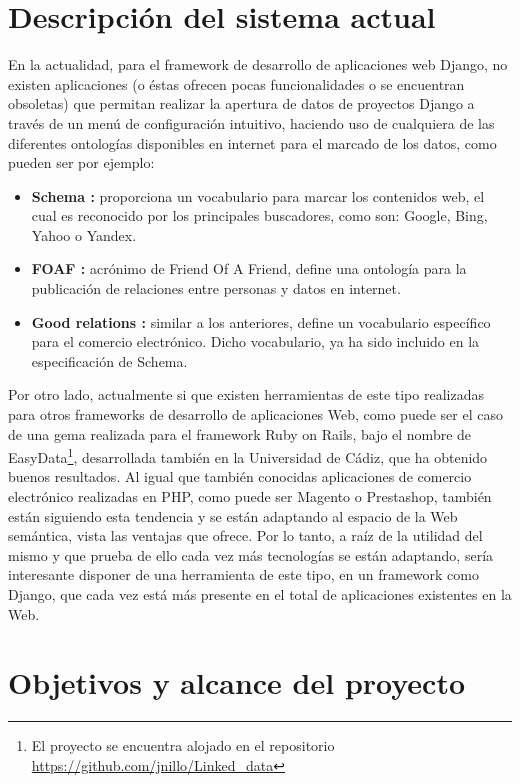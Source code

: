\section{Descripción del sistema actual}

En la actualidad, para el framework de desarrollo de aplicaciones web Django, no
existen aplicaciones (o éstas ofrecen pocas funcionalidades o se encuentran
obsoletas) que permitan realizar la apertura de datos de proyectos Django a
través de un menú de configuración intuitivo, haciendo uso de cualquiera de las
diferentes ontologías disponibles en internet para el marcado de los datos, como
pueden ser por ejemplo:
\begin{itemize}
    \item \textbf{Schema \cite{schema}:} proporciona un vocabulario para
        marcar los contenidos web, el cual es reconocido por los principales
        buscadores, como son: Google, Bing, Yahoo o Yandex.
    \item \textbf{FOAF \cite{foaf}:} acrónimo de Friend Of A Friend, define
        una ontología para la publicación de relaciones entre personas y datos
        en internet.
    \item \textbf{Good relations \cite{GoodRelations}:} similar a los
        anteriores, define un vocabulario específico para el comercio
        electrónico. Dicho vocabulario, ya ha sido incluido en la especificación
        de Schema.
\end{itemize}

Por otro lado, actualmente si que existen herramientas de este tipo realizadas
para otros frameworks de desarrollo de aplicaciones Web, como puede ser el caso
de una gema realizada para el framework Ruby on Rails, bajo el nombre de
EasyData\footnote{El proyecto se encuentra alojado en el repositorio
\url{https://github.com/jnillo/Linked_data}}, desarrollada también en la
Universidad de Cádiz, que ha obtenido buenos resultados. Al igual que
también conocidas aplicaciones de comercio electrónico realizadas en PHP, como
puede ser Magento o Prestashop, también están siguiendo esta tendencia y se
están adaptando al espacio de la Web semántica, vista las ventajas que ofrece.
Por lo tanto, a raíz de la utilidad del mismo y que prueba de ello cada vez más
tecnologías se están adaptando, sería interesante disponer de una herramienta de
este tipo, en un framework como Django, que cada vez está más presente en el
total de aplicaciones existentes en la Web.

\section{Objetivos y alcance del proyecto}
\label{sec:objetivos}

